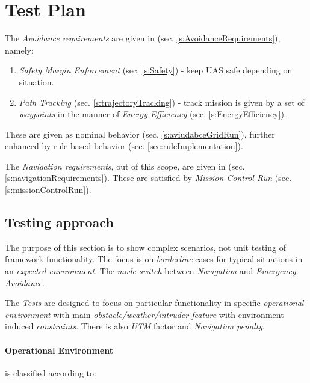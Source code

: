\section{Test Plan} \label{s:testPlan}

\noindent The \emph{Avoidance requirements} are given in (sec. \ref{s:AvoidanceRequirements}), namely:

\begin{enumerate}
    \item\emph{Safety Margin Enforcement} (sec. \ref{s:Safety}) - keep UAS safe depending on situation.
    
    \item\emph{Path Tracking} (sec. \ref{s:trajectoryTracking}) - track mission is given by a set of \emph{waypoints} in the manner of \emph{Energy Efficiency} (sec. \ref{s:EnergyEfficiency}).
\end{enumerate}

These are given as nominal behavior (sec. \ref{s:aviudabceGridRun}), further enhanced by rule-based behavior (sec. \ref{sec:ruleImplementation}).

The \emph{Navigation requirements}, out of this scope, are given in (sec. \ref{s:navigationRequirements}). These are satisfied by \emph{Mission Control Run} (sec. \ref{s:missionControlRun}).


\subsection{Testing approach}\label{s:testingApproach}

\noindent The purpose of this section is to show complex scenarios, not unit testing of framework functionality. The focus is on \emph{borderline} cases for typical situations in an \emph{expected environment}. The \emph{mode switch} between \emph{Navigation} and \emph{Emergency Avoidance}.

\noindent The \emph{Tests} are designed to focus on particular functionality in specific \emph{operational environment} with main \emph{obstacle/weather/intruder feature} with environment induced \emph{constraints}. There is also \emph{UTM} factor and \emph{Navigation penalty}.

\paragraph{Operational Environment} is classified according to:

